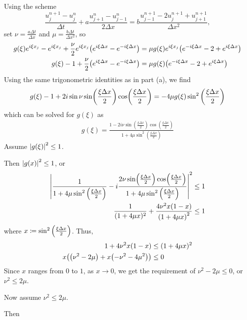 \documentclass{article} %
\theoremstyle{plain}
\newcommand{\Dx}{\Delta x}
\newcommand{\Dt}{\Delta t}
\numberwithin{equation}{section} %
\numberwithin{figure}{section} %
\numberwithin{table}{section} %
\begin{document}
\begin{enumerate}[\ \ (a)]
        Using the scheme $$\frac{u_j^{n+1} - u_j^n}{\Dt} + a\frac{u_{j+1}^n - u_{j-1}^n}{2\Dx} = b\frac{u_{j-1}^{n+1} - 2u_j^{n+1} + u_{j+1}^{n+1}}{\Dx^2},$$ set $\nu = \frac{a\Dt}{\Dx}$ and $\mu = \frac{b\Dt}{\Dx^2}$, so
        \begin{align*}
            g(\xi)e^{i\xi x_j} - e^{i\xi x_j} + \frac{\nu}{2}e^{i\xi x_j}\qty(e^{i\xi\Dx} - e^{-i\xi\Dx}) &= \mu g(\xi)e^{i\xi x_j}\qty(e^{-i\xi\Dx} - 2 + e^{i\xi\Dx}) \\
            g(\xi) - 1 + \frac{\nu}{2}\qty(e^{i\xi\Dx} - e^{-i\xi\Dx}) &= \mu g(\xi) \qty(e^{-i\xi\Dx} - 2 + e^{i\xi\Dx})
        \end{align*}
        Using the same trigonometric identities as in part (a), we find
        \begin{align*}
            g(\xi) - 1 + 2i\sin\nu\sin(\frac{\xi\Dx}{2})\cos(\frac{\xi\Dx}{2}) = -4\mu g(\xi)\sin^2\qty(\frac{\xi\Dx}{2})
        \end{align*}
        which can be solved for $g(\xi)$ as
        \begin{align*}
            g(\xi) = \frac{1 - 2i\nu\sin(\frac{\xi\Dx}{2})\cos(\frac{\xi\Dx}{2})}{1 + 4\mu\sin^2(\frac{\xi\Dx}{2})}
        \end{align*}
        Assume $\abs{g(\xi)}^2 \leq 1$.
        \begin{adjustwidth}{2cm}{2cm}
            Then $\abs{g(x)}^2 \leq 1$, or
            \begin{align*}
                \abs{\frac{1}{1 + 4\mu\sin^2\qty(\frac{\xi\Dx}{2})} - i\frac{2\nu\sin(\frac{\xi\Dx}{2})\cos(\frac{\xi\Dx}{2})}{1 + 4\mu\sin^2\qty(\frac{\xi\Dx}{2})}}^2 &\leq 1 \\
                \frac{1}{(1 + 4\mu x)^2} + \frac{4\nu^2 x(1-x)}{\qty(1 + 4\mu x)^2} &\leq 1
            \end{align*}
            where $x \coloneqq \sin^2\qty(\frac{\xi\Dx}{2})$.  Thus,
            \begin{align*}
                1 + 4\nu^2 x(1-x) &\leq (1 + 4\mu x)^2 \\
                x\qty(\qty(\nu^2 - 2\mu) + x\qty(-\nu^2 - 4\mu^2)) &\leq 0
            \end{align*}
            Since $x$ ranges from $0$ to $1$, as $x \rightarrow 0$, we get the requirement of $\nu^2 - 2\mu \leq 0$, or $\nu^2 \leq 2\mu$.
        \end{adjustwidth}
        Now assume $\nu^2 \leq 2\mu$.
        \begin{adjustwidth}{2cm}{2cm}
            Then
            \begin{align*}

\end{align*}
\end{adjustwidth}
\end{enumerate}
\end{document}
